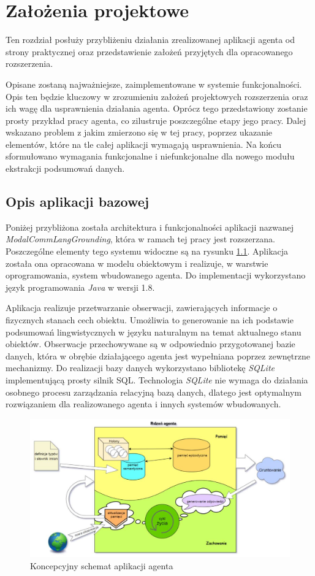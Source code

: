 \chapter{Założenia projektowe}

Ten rozdział posłuży przybliżeniu działania zrealizowanej aplikacji agenta od strony praktycznej oraz przedstawienie założeń przyjętych dla opracowanego rozszerzenia. 

Opisane zostaną najważniejsze, zaimplementowane w systemie funkcjonalności. Opis ten będzie kluczowy w zrozumieniu założeń projektowych rozszerzenia oraz ich wagę dla usprawnienia działania agenta. Oprócz tego przedstawiony zostanie prosty przykład pracy agenta, co zilustruje poszczególne etapy jego pracy. Dalej wskazano problem z jakim zmierzono się w tej pracy, poprzez ukazanie elementów, które na tle całej aplikacji wymagają usprawnienia. Na końcu sformułowano wymagania funkcjonalne i niefunkcjonalne dla nowego modułu ekstrakcji podsumowań danych.


\section{Opis aplikacji bazowej}

Poniżej przybliżona została architektura i funkcjonalności aplikacji nazwanej \textit{ModalCommLangGrounding}, która  w ramach tej pracy jest rozszerzana. Poszczególne elementy tego systemu widoczne są na rysunku \ref{rys:schemat}. Aplikacja została ona opracowana w modelu obiektowym i realizuje, w warstwie oprogramowania, system wbudowanego agenta. Do implementacji wykorzystano język programowania \textit{Java} w wersji 1.8.

Aplikacja realizuje przetwarzanie obserwacji, zawierających informacje o fizycznych stanach cech obiektu. Umożliwia to generowanie na ich podstawie podsumowań lingwistycznych w języku naturalnym na temat aktualnego stanu obiektów. Obserwacje przechowywane są w odpowiednio przygotowanej bazie danych, która w obrębie działającego agenta jest wypełniana poprzez zewnętrzne mechanizmy. Do realizacji bazy danych wykorzystano bibliotekę \textit{SQLite} implementującą prosty silnik SQL. Technologia \textit{SQLite} nie wymaga do działania osobnego procesu zarządzania relacyjną bazą danych, dlatego jest optymalnym rozwiązaniem dla realizowanego agenta i innych systemów wbudowanych.

\begin{figure}  
	\centering\includegraphics[width=.9\textwidth]{img/agent-schemat}
	\caption{Koncepcyjny schemat aplikacji agenta \cite{raport}}
	\label{rys:schemat}
\end{figure}

